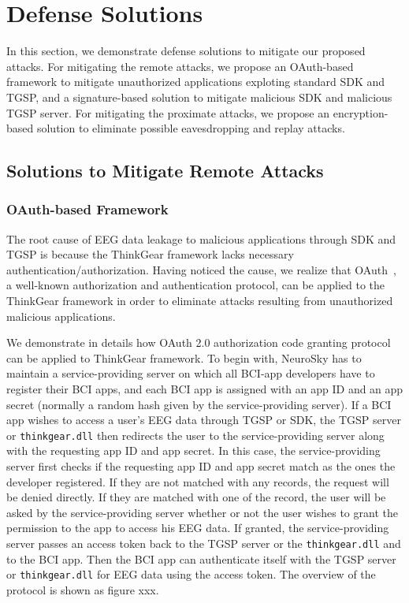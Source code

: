 \section{Defense Solutions}
\label{sec:defense}

In this section, we demonstrate defense solutions to mitigate our proposed attacks. For mitigating the remote attacks, we propose an OAuth-based framework to mitigate unauthorized applications exploting standard SDK and TGSP, and a signature-based solution to mitigate malicious SDK and malicious TGSP server. For mitigating the proximate attacks, we propose an encryption-based solution to eliminate possible eavesdropping and replay attacks.

\subsection{Solutions to Mitigate Remote Attacks}

\subsubsection{OAuth-based Framework}
The root cause of EEG data leakage to malicious applications through SDK and TGSP is because the ThinkGear framework lacks necessary authentication/authorization. Having noticed the cause, we realize that OAuth~\cite{hardt2012oauth}, a well-known authorization and authentication protocol, can be applied to the ThinkGear framework in order to eliminate attacks resulting from unauthorized malicious applications.

We demonstrate in details how OAuth 2.0 authorization code granting protocol can be applied to ThinkGear framework. To begin with, NeuroSky has to maintain a service-providing server on which all BCI-app developers have to register their BCI apps, and each BCI app is assigned with an app ID and an app secret (normally a random hash given by the service-providing server). If a BCI app wishes to access a user's EEG data through TGSP or SDK, the TGSP server or \texttt{thinkgear.dll} then redirects the user to the service-providing server along with the requesting app ID and app secret. In this case, the service-providing server first checks if the requesting app ID and app secret match as the ones the developer registered. If they are not matched with any records, the request will be denied directly. If they are matched with one of the record, the user will be asked by the service-providing server whether or not the user wishes to grant the permission to the app to access his EEG data. If granted, the service-providing server passes an access token back to the TGSP server or the \texttt{thinkgear.dll} and to the BCI app. Then the BCI app can authenticate itself with the TGSP server or \texttt{thinkgear.dll} for EEG data using the access token. The overview of the protocol is shown as figure xxx.
